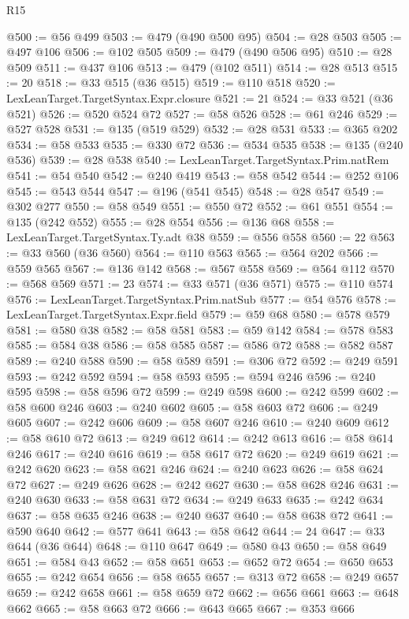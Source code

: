 \begin{lexlean}{R15}
\begin{coremodule}
@500 := @56 @499
@503 := @479 (@490 @500 @95)
@504 := @28 @503
@505 := @497 @106
@506 := @102 @505
@509 := @479 (@490 @506 @95)
@510 := @28 @509
@511 := @437 @106
@513 := @479 (@102 @511)
@514 := @28 @513
@515 := 20
@518 := @33 @515 (@36 @515)
@519 := @110 @518
@520 := LexLeanTarget.TargetSyntax.Expr.closure
@521 := 21
@524 := @33 @521 (@36 @521)
@526 := @520 @524 @72
@527 := @58 @526
@528 := @61 @246
@529 := @527 @528
@531 := @135 (@519 @529)
@532 := @28 @531
@533 := @365 @202
@534 := @58 @533
@535 := @330 @72
@536 := @534 @535
@538 := @135 (@240 @536)
@539 := @28 @538
@540 := LexLeanTarget.TargetSyntax.Prim.natRem
@541 := @54 @540
@542 := @240 @419
@543 := @58 @542
@544 := @252 @106
@545 := @543 @544
@547 := @196 (@541 @545)
@548 := @28 @547
@549 := @302 @277
@550 := @58 @549
@551 := @550 @72
@552 := @61 @551
@554 := @135 (@242 @552)
@555 := @28 @554
@556 := @136 @68
@558 := LexLeanTarget.TargetSyntax.Ty.adt @38
@559 := @556 @558
@560 := 22
@563 := @33 @560 (@36 @560)
@564 := @110 @563
@565 := @564 @202
@566 := @559 @565
@567 := @136 @142
@568 := @567 @558
@569 := @564 @112
@570 := @568 @569
@571 := 23
@574 := @33 @571 (@36 @571)
@575 := @110 @574
@576 := LexLeanTarget.TargetSyntax.Prim.natSub
@577 := @54 @576
@578 := LexLeanTarget.TargetSyntax.Expr.field
@579 := @59 @68
@580 := @578 @579
@581 := @580 @38
@582 := @58 @581
@583 := @59 @142
@584 := @578 @583
@585 := @584 @38
@586 := @58 @585
@587 := @586 @72
@588 := @582 @587
@589 := @240 @588
@590 := @58 @589
@591 := @306 @72
@592 := @249 @591
@593 := @242 @592
@594 := @58 @593
@595 := @594 @246
@596 := @240 @595
@598 := @58 @596 @72
@599 := @249 @598
@600 := @242 @599
@602 := @58 @600 @246
@603 := @240 @602
@605 := @58 @603 @72
@606 := @249 @605
@607 := @242 @606
@609 := @58 @607 @246
@610 := @240 @609
@612 := @58 @610 @72
@613 := @249 @612
@614 := @242 @613
@616 := @58 @614 @246
@617 := @240 @616
@619 := @58 @617 @72
@620 := @249 @619
@621 := @242 @620
@623 := @58 @621 @246
@624 := @240 @623
@626 := @58 @624 @72
@627 := @249 @626
@628 := @242 @627
@630 := @58 @628 @246
@631 := @240 @630
@633 := @58 @631 @72
@634 := @249 @633
@635 := @242 @634
@637 := @58 @635 @246
@638 := @240 @637
@640 := @58 @638 @72
@641 := @590 @640
@642 := @577 @641
@643 := @58 @642
@644 := 24
@647 := @33 @644 (@36 @644)
@648 := @110 @647
@649 := @580 @43
@650 := @58 @649
@651 := @584 @43
@652 := @58 @651
@653 := @652 @72
@654 := @650 @653
@655 := @242 @654
@656 := @58 @655
@657 := @313 @72
@658 := @249 @657
@659 := @242 @658
@661 := @58 @659 @72
@662 := @656 @661
@663 := @648 @662
@665 := @58 @663 @72
@666 := @643 @665
@667 := @353 @666

\end{coremodule}
\end{lexlean}
